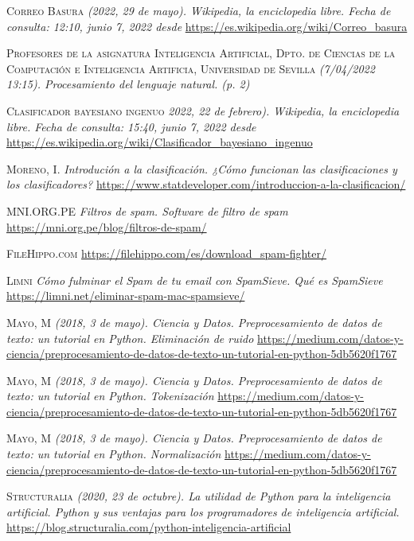 \documentclass[conference,a4paper]{IEEEtran}
\begin{document}
\begin{thebibliography}{10}
 \textsc{Correo Basura} \textit{(2022, 29 de mayo). Wikipedia, la enciclopedia libre. Fecha de consulta: 12:10, junio 7, 2022 desde} \url{https://es.wikipedia.org/wiki/Correo_basura}

 \textsc{Profesores de la asignatura Inteligencia Artificial, Dpto. de Ciencias de la Computación e Inteligencia Artificia, Universidad de Sevilla} \textit{(7/04/2022 13:15). Procesamiento del lenguaje natural. (p. 2)}

 \textsc{Clasificador bayesiano ingenuo} \textit{2022, 22 de febrero). Wikipedia, la enciclopedia libre. Fecha de consulta: 15:40, junio 7, 2022 desde} \url{https://es.wikipedia.org/wiki/Clasificador_bayesiano_ingenuo}

 \textsc{Moreno, I.} \textit{Introdución a la clasificación. ¿Cómo funcionan las clasificaciones y los clasificadores?} \url{https://www.statdeveloper.com/introduccion-a-la-clasificacion/}

 \textsc{MNI.ORG.PE} \textit{Filtros de spam. Software de filtro de spam} \url{https://mni.org.pe/blog/filtros-de-spam/}

 \textsc{FileHippo.com }  \url{https://filehippo.com/es/download_spam-fighter/}

 \textsc{Limni} \textit{Cómo fulminar el Spam de tu email con SpamSieve. Qué es SpamSieve} \url{https://limni.net/eliminar-spam-mac-spamsieve/}

 \textsc{Mayo, M} \textit{(2018, 3 de mayo). Ciencia y Datos. Preprocesamiento de datos de texto: un tutorial en Python. Eliminación de ruido} \url{https://medium.com/datos-y-ciencia/preprocesamiento-de-datos-de-texto-un-tutorial-en-python-5db5620f1767}

 \textsc{Mayo, M} \textit{(2018, 3 de mayo). Ciencia y Datos. Preprocesamiento de datos de texto: un tutorial en Python. Tokenización} \url{https://medium.com/datos-y-ciencia/preprocesamiento-de-datos-de-texto-un-tutorial-en-python-5db5620f1767}

 \textsc{Mayo, M} \textit{(2018, 3 de mayo). Ciencia y Datos. Preprocesamiento de datos de texto: un tutorial en Python. Normalización} \url{https://medium.com/datos-y-ciencia/preprocesamiento-de-datos-de-texto-un-tutorial-en-python-5db5620f1767}

 \textsc{Structuralia} \textit{(2020, 23 de octubre). La utilidad de Python para la inteligencia artificial. Python y sus ventajas para los programadores de inteligencia artificial.} \url{https://blog.structuralia.com/python-inteligencia-artificial}


\end{thebibliography}
\end{document}
